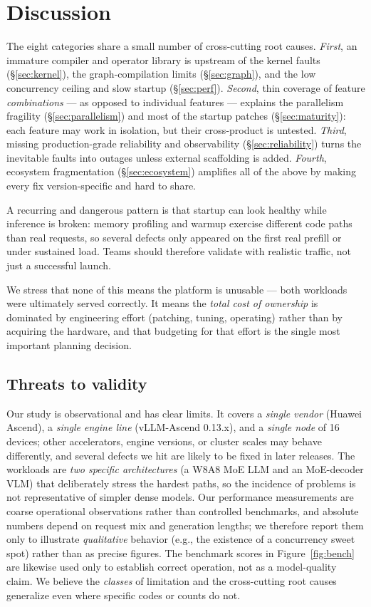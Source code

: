 \documentclass{article}
\begin{document}
\section{Discussion}
\label{sec:discussion}
The eight categories share a small number of cross-cutting root causes.
\emph{First}, an immature compiler and operator library is upstream of the kernel
faults (\S\ref{sec:kernel}), the graph-compilation limits (\S\ref{sec:graph}), and
the low concurrency ceiling and slow startup (\S\ref{sec:perf}). \emph{Second},
thin coverage of feature \emph{combinations} --- as opposed to individual features
--- explains the parallelism fragility (\S\ref{sec:parallelism}) and most of the
startup patches (\S\ref{sec:maturity}): each feature may work in isolation, but
their cross-product is untested. \emph{Third}, missing production-grade reliability
and observability (\S\ref{sec:reliability}) turns the inevitable faults into
outages unless external scaffolding is added. \emph{Fourth}, ecosystem
fragmentation (\S\ref{sec:ecosystem}) amplifies all of the above by making every
fix version-specific and hard to share.

A recurring and dangerous pattern is that startup can look healthy while inference
is broken: memory profiling and warmup exercise different code paths than real
requests, so several defects only appeared on the first real prefill or under
sustained load. Teams should therefore validate with realistic traffic, not just a
successful launch.

We stress that none of this means the platform is unusable --- both workloads were
ultimately served correctly. It means the \emph{total cost of ownership} is
dominated by engineering effort (patching, tuning, operating) rather than by
acquiring the hardware, and that budgeting for that effort is the single most
important planning decision.

\subsection{Threats to validity}
\label{sec:threats}
Our study is observational and has clear limits. It covers a \emph{single vendor}
(Huawei Ascend), a \emph{single engine line} (vLLM-Ascend 0.13.x), and a
\emph{single node} of 16 devices; other accelerators, engine versions, or cluster
scales may behave differently, and several defects we hit are likely to be fixed
in later releases. The workloads are \emph{two specific architectures} (a
W8A8 MoE LLM and an MoE-decoder VLM) that deliberately stress the hardest paths, so
the incidence of problems is not representative of simpler dense models. Our
performance measurements are coarse operational observations rather than
controlled benchmarks, and absolute numbers depend on request mix and generation
lengths; we therefore report them only to illustrate \emph{qualitative} behavior
(e.g., the existence of a concurrency sweet spot) rather than as precise figures.
The benchmark scores in Figure~\ref{fig:bench} are likewise used only to establish
correct operation, not as a model-quality claim. We believe the \emph{classes} of
limitation and the cross-cutting root causes generalize even where specific codes
or counts do not.
\end{document}
